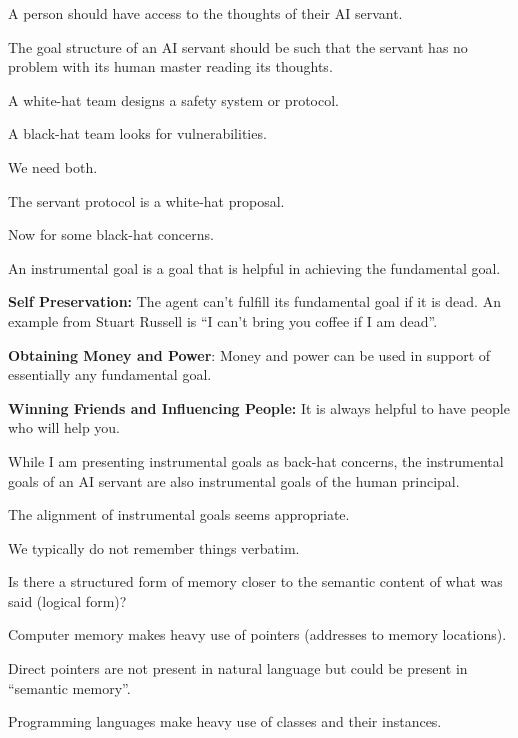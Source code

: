 {\vfill
A person should have access to the thoughts of their AI servant.

\vfill
The goal structure of an AI servant should be such that the servant has no problem
with its human master reading its thoughts.


A white-hat team designs a safety system or protocol.

\vfill
A black-hat team looks for vulnerabilities.

\vfill
We need both.

\vfill
The servant protocol is a white-hat proposal.

\vfill
Now for some black-hat concerns.


An instrumental goal is a goal that is helpful in achieving the fundamental goal.

\vfill
{\bf Self Preservation:} The agent can't fulfill its fundamental goal if it is dead.  An example from Stuart Russell is ``I can't bring you coffee if I am dead''.

\vfill
{\bf Obtaining Money and Power}: Money and power can be used in support of essentially any fundamental goal.

\vfill
{\bf Winning Friends and Influencing People:}  It is always helpful to have people who will help you.


While I am presenting instrumental goals as back-hat concerns, the instrumental goals of an AI servant are also instrumental goals of the human principal.

\vfill
The alignment of instrumental goals seems appropriate.


We typically do not remember things verbatim.

\vfill
Is there a structured form of memory closer to the semantic content of what was said (logical form)?

\vfill
Computer memory makes heavy use of pointers (addresses to memory locations).

\vfill
Direct pointers are not present in natural language but could be present in ``semantic memory''.


Programming languages make heavy use of classes and their instances.

}

